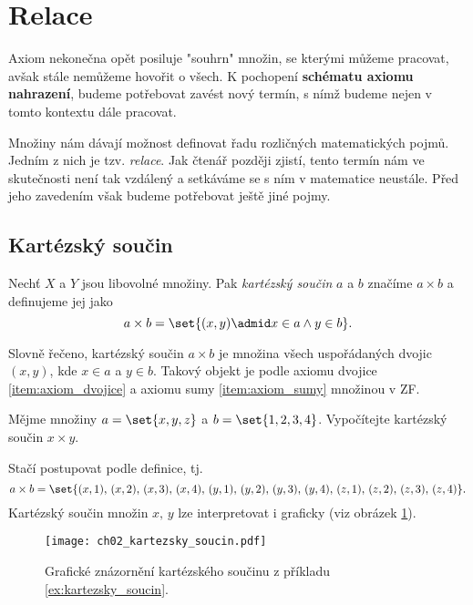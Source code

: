 \section{Relace}\label{sec:relace}
Axiom nekonečna opět posiluje "souhrn" množin, se kterými můžeme pracovat, avšak stále nemůžeme hovořit o všech. K pochopení \textbf{schématu axiomu nahrazení}, budeme potřebovat zavést nový termín, s nímž budeme nejen v tomto kontextu dále pracovat.\par
Množiny nám dávají možnost definovat řadu rozličných matematických pojmů. Jedním z nich je tzv. \emph{relace}. Jak čtenář později zjistí, tento termín nám ve skutečnosti není tak vzdálený a setkáváme se s ním v matematice neustále. Před jeho zavedením však budeme potřebovat ještě jiné pojmy.

\subsection{Kartézský součin}
\begin{definition}
    Nechť $X$ a $Y$ jsou libovolné množiny. Pak \emph{kartézský součin} $a$ a $b$ značíme $a\times b$ a definujeme jej jako
    \begin{equation*}
        a\times b=\set{(x,y) \admid x\in a \land y\in b}.
    \end{equation*}
\end{definition}
Slovně řečeno, kartézský součin $a\times b$ je množina všech uspořádaných dvojic $(x,y)$, kde $x\in a$ a $y\in b$. Takový objekt je podle axiomu dvojice \ref{item:axiom_dvojice} a axiomu sumy \ref{item:axiom_sumy} množinou v ZF.
\begin{example}\label{ex:kartezsky_soucin}
    Mějme množiny $a=\set{x,y,z}$ a $b=\set{1,2,3,4}$. Vypočítejte kartézský součin $x\times y$.
\end{example}
\begin{solution}
    Stačí postupovat podle definice, tj.
    \begin{equation*}
        a\times b=\set{(x,1),\,(x,2),\,(x,3),\,(x,4),\,(y,1),\,(y,2),\,(y,3),\,(y,4),\,(z,1),\,(z,2),\,(z,3),\,(z,4)}.
    \end{equation*}
    Kartézský součin množin $x,\,y$ lze interpretovat i graficky (viz obrázek \ref{fig:kartezsky_soucin}).
\end{solution}
\begin{figure}[h]
    \centering
    \texttt{[image: ch02\_kartezsky\_soucin.pdf]}
    \caption{Grafické znázornění kartézského součinu z příkladu \ref{ex:kartezsky_soucin}.}
    \label{fig:kartezsky_soucin}
\end{figure}
